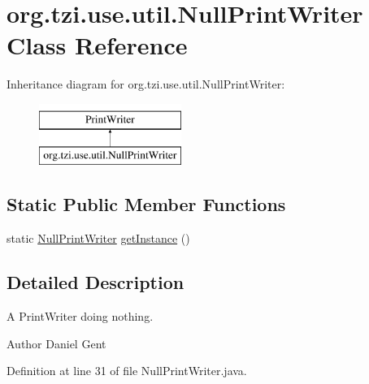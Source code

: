 \hypertarget{classorg_1_1tzi_1_1use_1_1util_1_1_null_print_writer}{\section{org.\-tzi.\-use.\-util.\-Null\-Print\-Writer Class Reference}
\label{classorg_1_1tzi_1_1use_1_1util_1_1_null_print_writer}
}
Inheritance diagram for org.\-tzi.\-use.\-util.\-Null\-Print\-Writer\-:\begin{figure}[H]
\begin{center}
\leavevmode
\includegraphics[height=2.000000cm]{classorg_1_1tzi_1_1use_1_1util_1_1_null_print_writer}
\end{center}
\end{figure}
\subsection*{Static Public Member Functions}
\begin{DoxyCompactItemize}
\item 
static \hyperlink{classorg_1_1tzi_1_1use_1_1util_1_1_null_print_writer}{Null\-Print\-Writer} \hyperlink{classorg_1_1tzi_1_1use_1_1util_1_1_null_print_writer_a8bf4d7e777ada7c13327f8a00825087d}{get\-Instance} ()
\end{DoxyCompactItemize}


\subsection{Detailed Description}
A Print\-Writer doing nothing. \begin{DoxyAuthor}{Author}
Daniel Gent 
\end{DoxyAuthor}


Definition at line 31 of file Null\-Print\-Writer.\-java.




